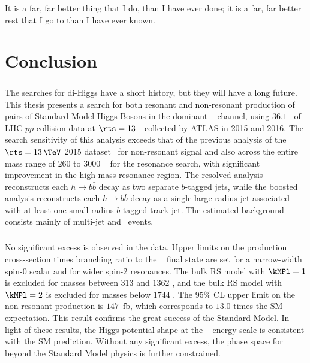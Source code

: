 \begin{savequote}[75mm]
It is a far, far better thing that I do, than I have ever done; it is a far, far better rest that I go to than I have ever known.
\end{savequote}

\chapter{Conclusion}
\label{conclusion}


\paragraph{}
The searches for di-Higgs have a short history, but they will have a long future. 
This thesis presents a search for both resonant and non-resonant production of pairs of Standard Model Higgs Bosons in the dominant \bbbb~ channel, using $36.1$ \ifb\ of LHC $pp$ collision data at $\rts = 13$~\TeV\ collected by ATLAS in 2015 and 2016. 
The search sensitivity of this analysis exceeds that of the previous analysis of the $\rts = 13\,\TeV$ 2015 dataset~\cite{EXOT-2015-11} for non-resonant signal and also across the entire mass range of $260$ to $3000$ \GeV~ for the resonance search, with significant improvement in the high mass resonance region. 
The resolved analysis reconstructs each $h \to b\bar{b}$ decay as two separate $b$-tagged jets, while the boosted analysis reconstructs each $h \to b\bar{b}$ decay as a single large-radius jet associated with at least one small-radius $b$-tagged track jet.
The estimated background consists mainly of multi-jet and \ttbar\ events.

\paragraph{}
No significant excess is observed in the data. 
Upper limits on the production cross-section times branching ratio to the \bbbb~ final state are set for a narrow-width spin-0 scalar and for wider spin-2 resonances. 
The bulk RS model with $\kMPl = 1$ is excluded for masses between $313$ and $1362$ \GeV, and the bulk RS model with $\kMPl = 2$ is excluded for masses below $1744$ \GeV.
The $95\%$ CL upper limit on the non-resonant production is $147$~fb, which corresponds to $13.0$ times the SM expectation.
This result confirms the great success of the Standard Model.
In light of these results, the Higgs potential shape at the \TeV~ energy scale is consistent with the SM prediction.
Without any significant excess, the phase space for beyond the Standard Model physics is further constrained.

